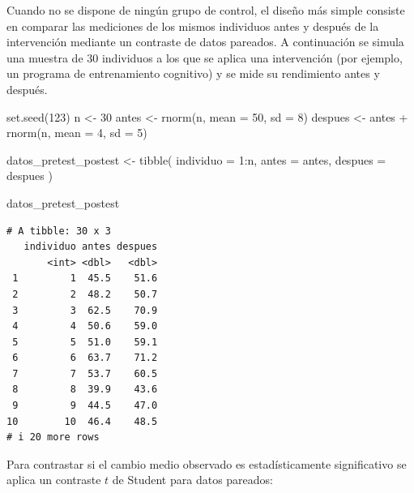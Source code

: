 \documentclass[
  spanish,
  a4paper,
]{scrreport}
\newenvironment{Shaded}{\begin{snugshade}}{\end{snugshade}}
\newcommand{\AttributeTok}[1]{\textcolor[rgb]{0.40,0.45,0.13}{#1}}
\newcommand{\ConstantTok}[1]{\textcolor[rgb]{0.56,0.35,0.01}{#1}}
\newcommand{\DecValTok}[1]{\textcolor[rgb]{0.68,0.00,0.00}{#1}}
\newcommand{\FunctionTok}[1]{\textcolor[rgb]{0.28,0.35,0.67}{#1}}
\newcommand{\NormalTok}[1]{\textcolor[rgb]{0.00,0.23,0.31}{#1}}
\newcommand{\OtherTok}[1]{\textcolor[rgb]{0.00,0.23,0.31}{#1}}
\newcommand{\SpecialCharTok}[1]{\textcolor[rgb]{0.37,0.37,0.37}{#1}}
\theoremstyle{definition}
\theoremstyle{definition}
\theoremstyle{remark}
\begin{document}
Cuando no se dispone de ningún grupo de control, el diseño más simple
consiste en comparar las mediciones de los mismos individuos antes y
después de la intervención mediante un contraste de datos pareados. A
continuación se simula una muestra de 30 individuos a los que se aplica
una intervención (por ejemplo, un programa de entrenamiento cognitivo) y
se mide su rendimiento antes y después.

\begin{Shaded}
\begin{Highlighting}[]
\FunctionTok{set.seed}\NormalTok{(}\DecValTok{123}\NormalTok{)}
\NormalTok{n }\OtherTok{\textless{}{-}} \DecValTok{30}
\NormalTok{antes }\OtherTok{\textless{}{-}} \FunctionTok{rnorm}\NormalTok{(n, }\AttributeTok{mean =} \DecValTok{50}\NormalTok{, }\AttributeTok{sd =} \DecValTok{8}\NormalTok{)}
\NormalTok{despues }\OtherTok{\textless{}{-}}\NormalTok{ antes }\SpecialCharTok{+} \FunctionTok{rnorm}\NormalTok{(n, }\AttributeTok{mean =} \DecValTok{4}\NormalTok{, }\AttributeTok{sd =} \DecValTok{5}\NormalTok{)}

\NormalTok{datos\_pretest\_postest }\OtherTok{\textless{}{-}} \FunctionTok{tibble}\NormalTok{(}
  \AttributeTok{individuo =} \DecValTok{1}\SpecialCharTok{:}\NormalTok{n,}
  \AttributeTok{antes =}\NormalTok{ antes,}
  \AttributeTok{despues =}\NormalTok{ despues}
\NormalTok{)}

\NormalTok{datos\_pretest\_postest}
\end{Highlighting}
\end{Shaded}

\begin{verbatim}
# A tibble: 30 x 3
   individuo antes despues
       <int> <dbl>   <dbl>
 1         1  45.5    51.6
 2         2  48.2    50.7
 3         3  62.5    70.9
 4         4  50.6    59.0
 5         5  51.0    59.1
 6         6  63.7    71.2
 7         7  53.7    60.5
 8         8  39.9    43.6
 9         9  44.5    47.0
10        10  46.4    48.5
# i 20 more rows
\end{verbatim}

Para contrastar si el cambio medio observado es estadísticamente
significativo se aplica un contraste \(t\) de Student para datos
pareados:

\begin{Shaded}
\end{Shaded}
\end{document}
